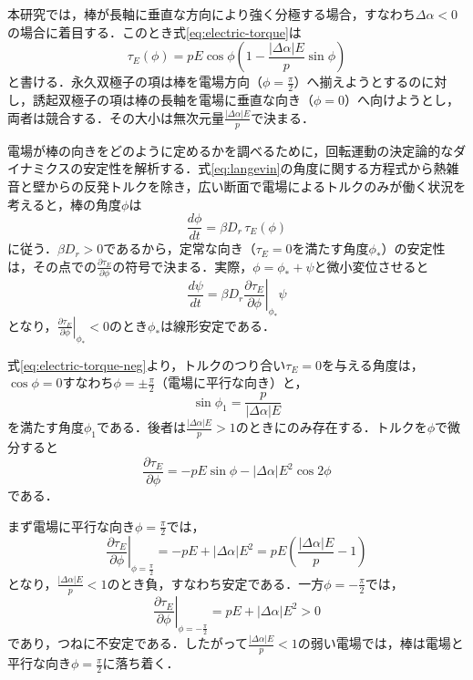 \documentclass[dvipdfmx]{ampbt}
\begin{document}
  本研究では，棒が長軸に垂直な方向により強く分極する場合，すなわち$\Delta\alpha<0$の場合に着目する．このとき式\eqref{eq:electric-torque}は
  \begin{equation}
    \tau_E(\phi)
    =pE\cos\phi
    \left(
    1-\frac{|\Delta\alpha|E}{p}\sin\phi
    \right)
    \label{eq:electric-torque-neg}
  \end{equation}
  と書ける．永久双極子の項は棒を電場方向（$\phi=\frac{\pi}{2}$）へ揃えようとするのに対し，誘起双極子の項は棒の長軸を電場に垂直な向き（$\phi=0$）へ向けようとし，両者は競合する．その大小は無次元量$\frac{|\Delta\alpha|E}{p}$で決まる．

  電場が棒の向きをどのように定めるかを調べるために，回転運動の決定論的なダイナミクスの安定性を解析する．式\eqref{eq:langevin}の角度に関する方程式から熱雑音と壁からの反発トルクを除き，広い断面で電場によるトルクのみが働く状況を考えると，棒の角度$\phi$は
  \begin{equation}
    \frac{d\phi}{dt}=\beta D_r\,\tau_E(\phi)
    \label{eq:angle-dynamics}
  \end{equation}
  に従う．$\beta D_r>0$であるから，定常な向き（$\tau_E=0$を満たす角度$\phi_\ast$）の安定性は，その点での$\frac{\partial\tau_E}{\partial\phi}$の符号で決まる．実際，$\phi=\phi_\ast+\psi$と微小変位させると
  \begin{equation}
    \frac{d\psi}{dt}
    =\beta D_r
    \left.\frac{\partial\tau_E}{\partial\phi}\right|_{\phi_\ast}\psi
  \end{equation}
  となり，$\left.\frac{\partial\tau_E}{\partial\phi}\right|_{\phi_\ast}<0$のとき$\phi_\ast$は線形安定である．

  式\eqref{eq:electric-torque-neg}より，トルクのつり合い$\tau_E=0$を与える角度は，$\cos\phi=0$すなわち$\phi=\pm\frac{\pi}{2}$（電場に平行な向き）と，
  \begin{equation}
    \sin\phi_1=\frac{p}{|\Delta\alpha|E}
    \label{eq:tilted-angle}
  \end{equation}
  を満たす角度$\phi_1$である．後者は$\frac{|\Delta\alpha|E}{p}>1$のときにのみ存在する．トルクを$\phi$で微分すると
  \begin{equation}
    \frac{\partial\tau_E}{\partial\phi}
    =-pE\sin\phi-|\Delta\alpha|E^2\cos2\phi
    \label{eq:dtau-dphi}
  \end{equation}
  である．

  まず電場に平行な向き$\phi=\frac{\pi}{2}$では，
  \begin{equation}
    \left.\frac{\partial\tau_E}{\partial\phi}\right|_{\phi=\frac{\pi}{2}}
    =-pE+|\Delta\alpha|E^2
    =pE\left(\frac{|\Delta\alpha|E}{p}-1\right)
  \end{equation}
  となり，$\frac{|\Delta\alpha|E}{p}<1$のとき負，すなわち安定である．一方$\phi=-\frac{\pi}{2}$では，
  \begin{equation}
    \left.\frac{\partial\tau_E}{\partial\phi}\right|_{\phi=-\frac{\pi}{2}}
    =pE+|\Delta\alpha|E^2>0
  \end{equation}
  であり，つねに不安定である．したがって$\frac{|\Delta\alpha|E}{p}<1$の弱い電場では，棒は電場と平行な向き$\phi=\frac{\pi}{2}$に落ち着く．
\end{document}
